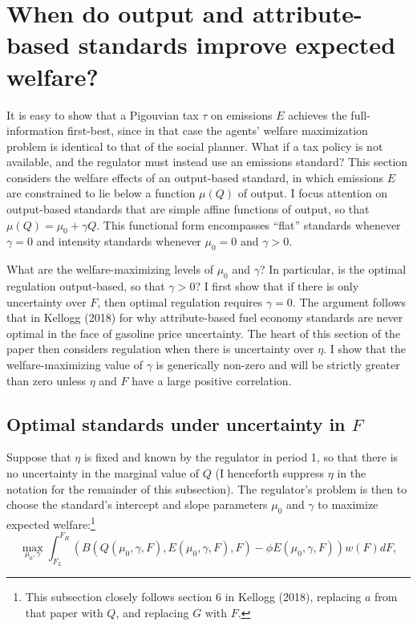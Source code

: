 \documentclass[12pt]{article}
\begin{document}
\section{When do output and attribute-based standards improve expected welfare?} \label{sec:thy}

It is easy to show that a Pigouvian tax $\tau$ on emissions $E$ achieves the full-information first-best, since in that case the agents' welfare maximization problem is identical to that of the social planner. What if a tax policy is not available, and the regulator must instead use an emissions standard? This section considers the welfare effects of an output-based standard, in which emissions $E$ are constrained to lie below a function $\mu(Q)$ of output. I focus attention on output-based standards that are simple affine functions of output, so that $\mu(Q)=\mu_0+\gamma Q$. This functional form encompasses ``flat'' standards whenever $\gamma=0$ and intensity standards whenever $\mu_0=0$ and $\gamma>0$.

What are the welfare-maximizing levels of $\mu_0$ and $\gamma$? In particular, is the optimal regulation output-based, so that $\gamma>0$? I first show that if there is only uncertainty over $F$, then optimal regulation requires $\gamma=0$. The argument follows that in Kellogg (2018) for why attribute-based fuel economy standards are never optimal in the face of gasoline price uncertainty. The heart of this section of the paper then considers regulation when there is uncertainty over $\eta$. I show that the welfare-maximizing value of $\gamma$ is generically non-zero and will be strictly greater than zero unless $\eta$ and $F$ have a large positive correlation.


\subsection{Optimal standards under uncertainty in $F$} \label{sec:Funcert}

Suppose that $\eta$ is fixed and known by the regulator in period 1, so that there is no uncertainty in the marginal value of $Q$ (I henceforth suppress $\eta$ in the notation for the remainder of this subsection). The regulator's problem is then to choose the standard's intercept and slope parameters $\mu_0$ and $\gamma$ to maximize expected welfare:\footnote{This subsection closely follows section 6 in Kellogg (2018), replacing $a$ from that paper with $Q$, and replacing $G$ with $F$.}
\begin{equation}
\max_{\mu_0,\gamma} \int_{F_L}^{F_H}\left(B(Q(\mu_0,\gamma,F),E(\mu_0,\gamma,F),F)-\phi E(\mu_0,\gamma,F)\right)w(F)dF, \label{eq:RegProbFuncert}
\end{equation}
\end{document}
